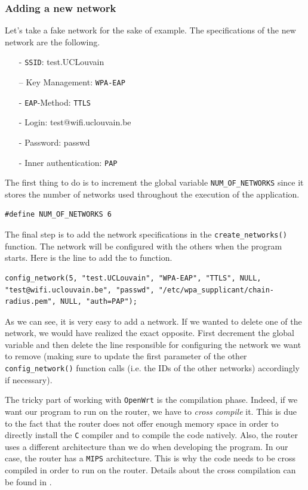 \subsubsection*{Adding a new network}
Let's take a fake network for the sake of example. The specifications of the new network are the following.

\begin{itemize}
	\item [-] \texttt{SSID}: test.UCLouvain
	\item [–] Key Management: \texttt{WPA-EAP}
	\item [-] \texttt{EAP}-Method: \texttt{TTLS}
	\item [-] Login: test@wifi.uclouvain.be
	\item [-] Password: passwd
	\item [-] Inner authentication: \texttt{PAP}
\end{itemize}

The first thing to do is to increment the global variable \texttt{NUM\_OF\_NETWORKS} since it stores the number of networks used throughout the execution of the application.\\

\begin{lstlisting}[frame=single,breaklines=true]
#define NUM_OF_NETWORKS 6
\end{lstlisting}

The final step is to add the network specifications in the \texttt{create\_networks()} function. The network will be configured with the others when the program starts. Here is the line to add the to function.\\

\begin{lstlisting}[frame=single,breaklines=true]
config_network(5, "test.UCLouvain", "WPA-EAP", "TTLS", NULL, "test@wifi.uclouvain.be", "passwd", "/etc/wpa_supplicant/chain-radius.pem", NULL, "auth=PAP");
\end{lstlisting}

As we can see, it is very easy to add a network. If we wanted to delete one of the network, we would have realized the exact opposite. First decrement the global variable and then delete the line responsible for configuring the network we want to remove (making sure to update the first parameter of the other \texttt{config\_network()} function calls (i.e. the IDs of the other networks) accordingly if necessary).

The tricky part of working with \texttt{OpenWrt} is the compilation phase. Indeed, if we want our program to run on the router, we have to \textit{cross compile} it. This is due to the fact that the router does not offer enough memory space in order to directly install the \texttt{C} compiler and to compile the code natively. Also, the router uses a different architecture than we do when developing the program. In our case, the router has a \texttt{MIPS} architecture. This is why the code needs to be cross compiled in order to run on the router. Details about the cross compilation can be found in \cite{crosscompile}.


